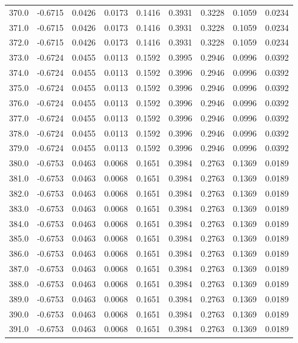 \begin{longtable}{lrrrrrrrr}
370.0 & -0.6715 & 0.0426 & 0.0173 & 0.1416 & 0.3931 & 0.3228 & 0.1059 & 0.0234 \\
371.0 & -0.6715 & 0.0426 & 0.0173 & 0.1416 & 0.3931 & 0.3228 & 0.1059 & 0.0234 \\
372.0 & -0.6715 & 0.0426 & 0.0173 & 0.1416 & 0.3931 & 0.3228 & 0.1059 & 0.0234 \\
373.0 & -0.6724 & 0.0455 & 0.0113 & 0.1592 & 0.3995 & 0.2946 & 0.0996 & 0.0392 \\
374.0 & -0.6724 & 0.0455 & 0.0113 & 0.1592 & 0.3996 & 0.2946 & 0.0996 & 0.0392 \\
375.0 & -0.6724 & 0.0455 & 0.0113 & 0.1592 & 0.3996 & 0.2946 & 0.0996 & 0.0392 \\
376.0 & -0.6724 & 0.0455 & 0.0113 & 0.1592 & 0.3996 & 0.2946 & 0.0996 & 0.0392 \\
377.0 & -0.6724 & 0.0455 & 0.0113 & 0.1592 & 0.3996 & 0.2946 & 0.0996 & 0.0392 \\
378.0 & -0.6724 & 0.0455 & 0.0113 & 0.1592 & 0.3996 & 0.2946 & 0.0996 & 0.0392 \\
379.0 & -0.6724 & 0.0455 & 0.0113 & 0.1592 & 0.3996 & 0.2946 & 0.0996 & 0.0392 \\
380.0 & -0.6753 & 0.0463 & 0.0068 & 0.1651 & 0.3984 & 0.2763 & 0.1369 & 0.0189 \\
381.0 & -0.6753 & 0.0463 & 0.0068 & 0.1651 & 0.3984 & 0.2763 & 0.1369 & 0.0189 \\
382.0 & -0.6753 & 0.0463 & 0.0068 & 0.1651 & 0.3984 & 0.2763 & 0.1369 & 0.0189 \\
383.0 & -0.6753 & 0.0463 & 0.0068 & 0.1651 & 0.3984 & 0.2763 & 0.1369 & 0.0189 \\
384.0 & -0.6753 & 0.0463 & 0.0068 & 0.1651 & 0.3984 & 0.2763 & 0.1369 & 0.0189 \\
385.0 & -0.6753 & 0.0463 & 0.0068 & 0.1651 & 0.3984 & 0.2763 & 0.1369 & 0.0189 \\
386.0 & -0.6753 & 0.0463 & 0.0068 & 0.1651 & 0.3984 & 0.2763 & 0.1369 & 0.0189 \\
387.0 & -0.6753 & 0.0463 & 0.0068 & 0.1651 & 0.3984 & 0.2763 & 0.1369 & 0.0189 \\
388.0 & -0.6753 & 0.0463 & 0.0068 & 0.1651 & 0.3984 & 0.2763 & 0.1369 & 0.0189 \\
389.0 & -0.6753 & 0.0463 & 0.0068 & 0.1651 & 0.3984 & 0.2763 & 0.1369 & 0.0189 \\
390.0 & -0.6753 & 0.0463 & 0.0068 & 0.1651 & 0.3984 & 0.2763 & 0.1369 & 0.0189 \\
391.0 & -0.6753 & 0.0463 & 0.0068 & 0.1651 & 0.3984 & 0.2763 & 0.1369 & 0.0189 \\

\end{longtable}
